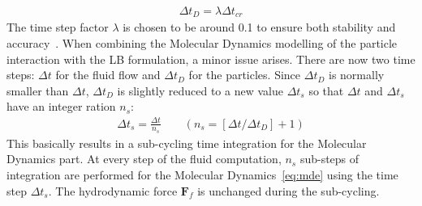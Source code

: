 \begin{eqnarray}
\Delta \mathit{t}_{D}=\lambda \Delta \mathit{t}_{cr}
\end{eqnarray}
The time step factor $\lambda$ is chosen to be around 0.1 to ensure both stability and accuracy~\citep{He1997}. When combining the Molecular Dynamics modelling of the particle interaction with the LB formulation, a minor issue arises. There are now two time steps: $\Delta t$ for the fluid flow and $\Delta t_{D}$ for the particles. Since $\Delta t_{D}$ is normally smaller than $\Delta t$, $\Delta t_{D}$ is slightly reduced to a new value $\Delta t_{s}$ so that $\Delta t$ and $\Delta t_{s}$ have an integer ration $\mathit{n}_{\mathit{s}}$:
\begin{eqnarray}
\Delta t_{s}=\frac{\Delta t}{\mathit{n}_{s}} \qquad(\mathit{n}_{s}=[\Delta t/ \Delta t_{D}]+1)
\end{eqnarray} 
This basically results in a sub-cycling time integration for the Molecular Dynamics part. At every step of the fluid computation, $\mathit{n}_{s}$ sub-steps of integration are performed for the Molecular Dynamics~\eqref{eq:mde} using the time step $\Delta t_{s}$. The hydrodynamic force $\mathbf{F}_{f}$ is unchanged during the sub-cycling. 
